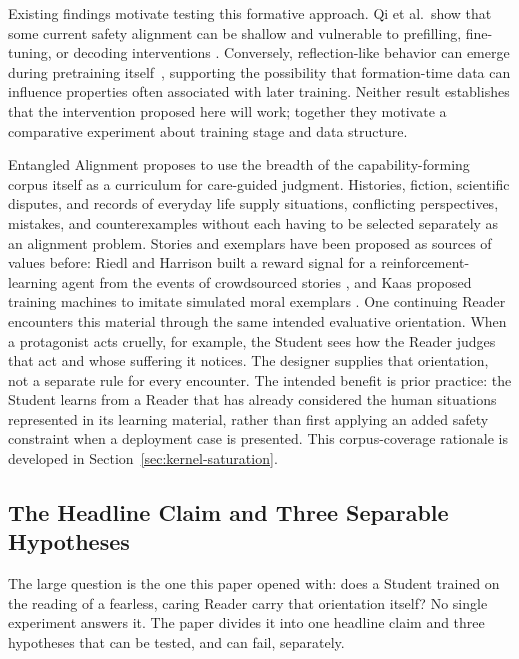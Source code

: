 \documentclass[11pt]{article}
\begin{document}
Existing findings motivate testing this formative approach. Qi et al.\ show that some current safety alignment
can be shallow and vulnerable to prefilling, fine-tuning, or decoding
interventions \cite{qi2024safety}. Conversely, reflection-like behavior can
emerge during pretraining itself~\cite{rethinkingreflection2025}, supporting
the possibility that formation-time data can influence properties often
associated with later training. Neither result establishes that the
intervention proposed here will work; together they motivate a comparative
experiment about training stage and data structure.

Entangled Alignment proposes to use the breadth of the capability-forming
corpus itself as a curriculum for care-guided judgment. Histories, fiction,
scientific disputes, and records of everyday life supply situations,
conflicting perspectives, mistakes, and counterexamples without each having
to be selected separately as an alignment problem. Stories and exemplars have
been proposed as sources of values before: Riedl and Harrison built a reward
signal for a reinforcement-learning agent from the events of crowdsourced
stories \cite{riedl2016stories}, and Kaas proposed training machines to imitate
simulated moral exemplars \cite{kaas2025exemplars}. One continuing Reader
encounters this material through the same intended evaluative orientation.
When a protagonist acts cruelly, for example, the Student sees how the Reader
judges that act and whose suffering it notices.
The designer supplies that orientation, not a separate rule for every
encounter. The intended benefit is prior practice: the Student learns from a
Reader that has already considered the human situations represented in its learning material,
rather than first applying an added safety constraint when a deployment case
is presented. This corpus-coverage rationale is developed in
Section~\ref{sec:kernel-saturation}.

\subsection{The Headline Claim and Three Separable Hypotheses}\label{sec:three-hypotheses}

The large question is the one this paper opened with: does a Student trained on
the reading of a fearless, caring Reader carry that orientation itself? No
single experiment answers it. The paper divides it into one headline claim and
three hypotheses that can be tested, and can fail, separately.
\end{document}
